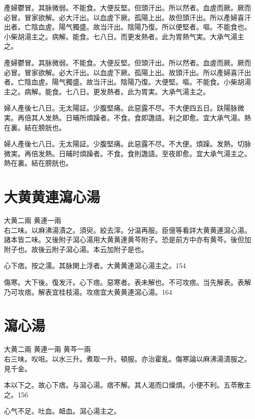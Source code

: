 產婦鬱{\khaaitp 冒}。其脉微弱。不能食。大便反堅。但頭汗出。所以然者。血虗而厥。厥而必冒。冒家欲解。必大汗出。以血虗下厥。孤陽上出。故但頭汗出。所以產婦喜汗出者。亡陰血虗。陽气獨盛。故当汗出。陰陽乃復。所以便堅者。嘔。不能食也。小柴胡湯主之。病解。能食。七八日。而更发熱者。此为胃熱气実。大承气湯主之。{\wuben}

產婦鬱冒。其脉微弱。不能食。大便反堅。但頭汗出。所以然者。血虗而厥。厥而必冒。冒家欲解。必大汗出。以血虗下厥。孤陽上出。故頭汗出。所以產婦喜汗出者。亡陰血虗。陽气獨盛。故当汗出。陰陽乃復。大便堅。嘔。不能食。小柴胡湯主之。病解。能食。七八日。更发熱者。此为胃実。大承气湯主之。{\dengben}

婦人產後七八日。无太陽証。少腹堅痛。此惡露不尽。不大便四五日。趺陽脉微実。再倍其人发熱。日晡所煩躁者。不食。食即譫語。利之即愈。宜大承气湯。熱在裏。結在膀胱也。{\wuben}

{\khaaitp 婦人}產後七八日。无太陽証。少腹堅痛。此惡露不尽。不大便。煩躁。发熱。切脉微実。再倍发熱。日晡时煩躁者。不食。食則譫語。至夜即愈。宜大承气湯主之。熱在裏。結在膀胱也。{\dengben}

\section{大黄黄連瀉心湯}

大黄{\scriptsize 二兩} 黄連{\scriptsize 一兩}\\
右二味。以麻沸湯漬之。須臾。絞去滓。分温再服。{\scriptsize 臣億等看詳大黄黄連瀉心湯。諸本皆二味。又後附子瀉心湯用大黄黄連黄芩附子。恐是前方中亦有黄芩。後但加附子也。故後云附子瀉心湯。本云加附子是也。}

心下痞。按之濡。其脉関上浮者。大黄{\khaaitp 黄連}瀉心湯主之。154

傷寒。大下後。復发汗。心下痞。惡寒者。表未解也。不可攻痞。当先解表。表解乃可攻痞。解表宜桂枝湯。攻痞宜大黄黄連瀉心湯。164

\section{瀉心湯}

大黄{\scriptsize 二兩} 黄連{\scriptsize 一兩} 黄芩{\scriptsize 一兩}\\
右三味。㕮咀。以水三升。煮取一升。頓服。亦治霍亂。{\scriptsize 傷寒論以麻沸湯漬服之。見千金。}

本以下之。故心下痞。与瀉心湯。痞不解。其人渴而口燥{\khaaitp 煩}。小便不利。五苓散主之。156

心气不足。吐血。衄血。瀉心湯主之。

